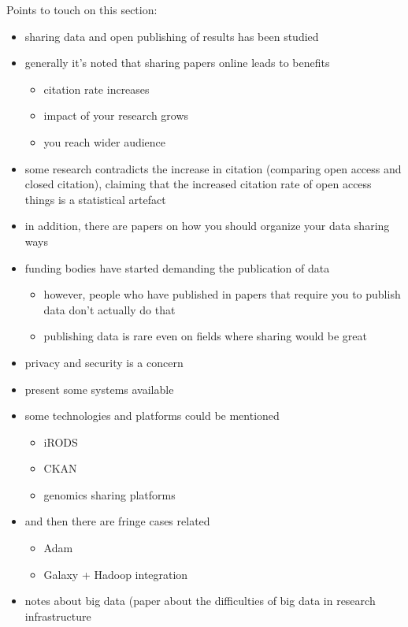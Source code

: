 Points to touch on this section:

\begin{itemize}
    \item sharing data and open publishing of results has been studied
    \item generally it's noted that sharing papers online leads to benefits
    \begin{itemize}
        \item citation rate increases
        \item impact of your research grows
        \item you reach wider audience
    \end{itemize}
    \item some research contradicts the increase in citation (comparing open
          access and closed citation), claiming that the increased citation
          rate of open access things is a statistical artefact
    \item in addition, there are papers on how you should organize your data
          sharing ways
    \item funding bodies have started demanding the publication of data
    \begin{itemize}
        \item however, people who have published in papers that require you
              to publish data don't actually do that
        \item publishing data is rare even on fields where sharing would be
              great
    \end{itemize}
    \item privacy and security is a concern
    \item present some systems available
    \item some technologies and platforms could be mentioned
    \begin{itemize}
        \item iRODS
        \item CKAN
        \item genomics sharing platforms
    \end{itemize}
    \item and then there are fringe cases related
    \begin{itemize}
        \item Adam
        \item Galaxy + Hadoop integration
    \end{itemize}
    \item notes about big data (paper about the difficulties of big data in
          research infrastructure
\end{itemize}

